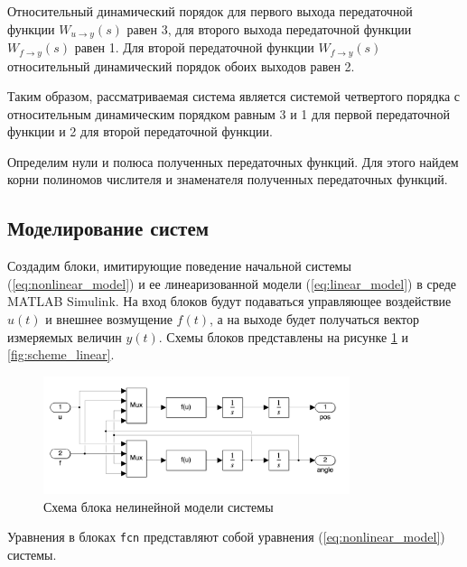 Относительный динамический порядок для первого выхода передаточной функции $W_{u \rightarrow y}(s)$ равен 3, 
для второго выхода передаточной функции $W_{f \rightarrow y}(s)$ равен 1. 
Для второй передаточной функции $W_{f \rightarrow y}(s)$ относительный динамический порядок обоих выходов равен 2. 

Таким образом, рассматриваемая система является системой четвертого порядка с относительным динамическим порядком
равным 3 и 1 для первой передаточной функции и 2 для второй передаточной функции. 

Определим нули и полюса полученных передаточных функций. Для этого найдем корни полиномов числителя и знаменателя 
полученных передаточных функций. 


\subsection{Моделирование систем}
Создадим блоки, имитирующие поведение начальной системы (\ref{eq:nonlinear_model}) и ее линеаризованной модели (\ref{eq:linear_model})
в среде MATLAB Simulink. На вход блоков будут подаваться управляющее воздействие $u(t)$ и внешнее возмущение $f(t)$, 
а на выходе будет получаться вектор измеряемых величин $y(t)$. Схемы блоков представлены на рисунке \ref{fig:scheme_unlinear} и \ref{fig:scheme_linear}. 


\begin{figure}[ht!]
    \centering
    \includegraphics[width=0.8\textwidth]{media/scheme_unlinear.png}
    \caption{Схема блока нелинейной модели системы}
    \label{fig:scheme_unlinear}
\end{figure}
Уравнения в блоках \texttt{fcn} представляют собой уравнения (\ref{eq:nonlinear_model}) системы. 

